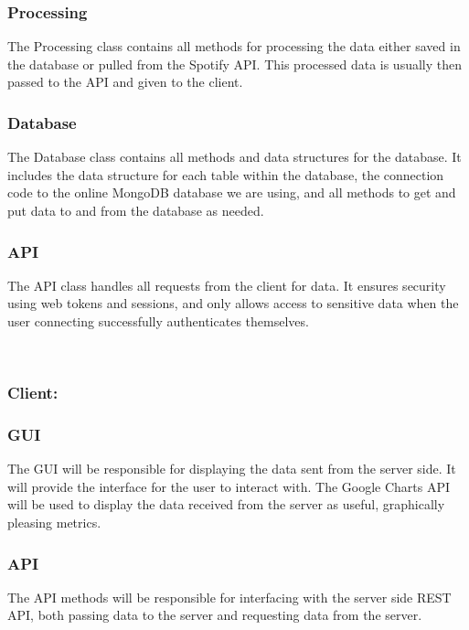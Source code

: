 \documentclass[10pt]{report}
\begin{document}
\subsubsection{Processing}
The Processing class contains all methods for processing the data either saved in the database or pulled from the Spotify API. This processed data is usually then passed to the API and given to the client.

\subsubsection{Database}
The Database class contains all methods and data structures for the database. It includes the data structure for each table within the database, the connection code to the online MongoDB database we are using, and all methods to get and put data to and from the database as needed.

\subsubsection{API}
The API class handles all requests from the client for data. It ensures security using web tokens and sessions, and only allows access to sensitive data when the user connecting successfully authenticates themselves.  


\leavevmode \\

\subsubsection{Client:}

\hrulefill

\subsubsection{GUI}
The GUI will be responsible for displaying the data sent from the server side. It will provide the interface for the user to interact with. The Google Charts API will be used to display the data received from the server as useful, graphically pleasing metrics.

\subsubsection{API}
The API methods will be responsible for interfacing with the server side REST API, both passing data to the server and requesting data from the server.
\end{document}
